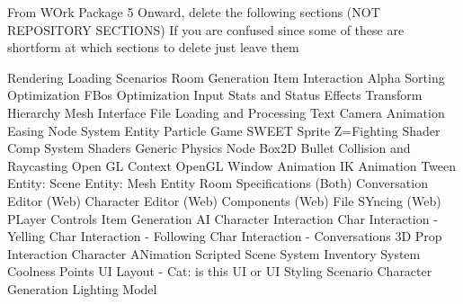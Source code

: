 From WOrk Package 5 Onward, delete the following sections (NOT REPOSITORY SECTIONS)
If you are confused since some of these are shortform at which sections to delete just leave them

Rendering
Loading Scenarios
Room Generation
Item Interaction
Alpha Sorting
Optimization
FBos
Optimization
Input
Stats and Status Effects
Transform Hierarchy
Mesh Interface
File Loading and Processing
Text
Camera
Animation Easing
Node System
Entity
Particle
Game
SWEET
Sprite
Z=Fighting
Shader Comp System
Shaders
Generic Physics Node
Box2D
Bullet
Collision and Raycasting
Open GL Context
OpenGL Window
Animation IK
Animation Tween
Entity: Scene
Entity: Mesh Entity
Room Specifications (Both)
Conversation Editor (Web)
Character Editor (Web)
Components (Web)
File SYncing (Web)
PLayer Controls
Item Generation
AI
Character Interaction
Char Interaction - Yelling
Char Interaction - Following
Char Interaction - Conversations
3D Prop Interaction
Character ANimation
Scripted Scene System
Inventory System
Coolness Points
UI Layout - Cat: is this UI or UI Styling
Scenario
Character Generation
Lighting Model
